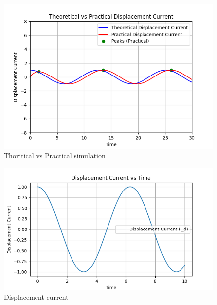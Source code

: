 \documentclass[journal,12pt,twocolumn]{IEEEtran}
\begin{document}
\begin{figure}[ht]
    \centering
    \includegraphics[width=\columnwidth]{figs/Figure_2.png}
    \caption{Thoritical vs Practical simulation}
    \label{fig:fig_gate_ec_2022_24_2}
\end{figure}

\begin{figure}[ht]
    \centering
    \includegraphics[width=\columnwidth]{figs/Figure_4.png}
    \caption{Displacement current}
    \label{fig:fig_gate_ec_2022_24_3}
\end{figure}
\end{document}
